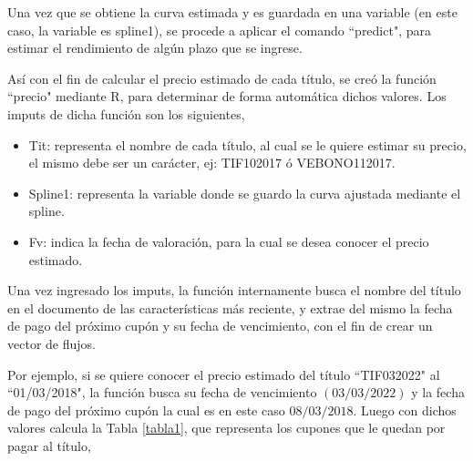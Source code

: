 \hspace{0.4cm} Una vez que se obtiene la curva estimada y es guardada en una variable (en este caso, la variable es spline1), se procede a aplicar el comando ``predict", para estimar el rendimiento de alg\'un plazo que se ingrese.

\hspace{0.4cm} As\'i con el fin de calcular el precio estimado de cada t\'itulo, se cre\'o la funci\'on ``precio"\hspace{0.01cm} mediante R, para determinar de forma autom\'atica dichos valores. Los imputs de dicha funci\'on son los siguientes,


\begin{itemize}
  \item Tit: representa el nombre de cada t\'itulo, al cual se le quiere estimar su precio, el mismo debe ser un car\'acter, ej: TIF102017 \'o VEBONO112017.
  \item Spline1: representa la variable donde se guardo la curva ajustada mediante el spline.
  \item Fv: indica la fecha de valoraci\'on, para la cual se desea conocer el precio estimado.
\end{itemize}


\hspace{0.4cm} Una vez ingresado los imputs, la funci\'on internamente busca el nombre del t\'itulo en el documento de las caracter\'isticas m\'as reciente, y extrae del mismo la fecha de pago del pr\'oximo cup\'on y su fecha de vencimiento, con el fin de crear un vector de flujos.


\hspace{0.4cm} Por ejemplo, si se quiere conocer el precio estimado del t\'itulo ``TIF032022" \hspace{0.01cm} al ``01/03/2018", la funci\'on busca su fecha de vencimiento $(03/03/2022)$ y la fecha de pago del pr\'oximo cup\'on la cual es en este caso $08/03/2018$. Luego con dichos valores calcula la Tabla \ref{tabla1}, que representa los cupones que le quedan por pagar al t\'itulo,


